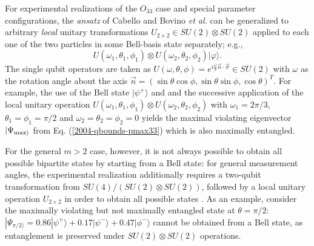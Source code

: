 \documentclass[prl,showpacs,showkeys,amsfonts,amsmath,twocolumn]{revtex4}
\begin{document}
For experimental realizations of the $O_{33}$ case and special parameter configurations,
the {\it ansatz} of Cabello \cite{cabello-2003a} and Bovino {\it et al.} \cite{bovino-2003}
can be generalized to arbitrary {\em local}
unitary transformations $U_{2\times 2} \in SU(2) \otimes SU(2)$ applied to each one of the two particles
in some Bell-basis state
separately; e.g.,
\begin{equation}
  U(\omega_1,\theta_1,\phi_1)\otimes U(\omega_2,\theta_2,\phi_2) |\varphi \rangle .
\label{2004-qbounds-gencab}
\end{equation}
The single
qubit operators are taken as $U(\omega,\theta,\phi) =
e^{i\frac{\omega}{2} \vec{n}\cdot\vec{\sigma}} \in SU(2)$ with
$\omega$ as the rotation angle about the axis $\vec{n}=
(\sin\theta\cos\phi,\sin\theta\sin\phi,\cos\theta)^T$.
For example, the use of the Bell state
$|\psi^+ \rangle $ and
and the successive application of the local unitary operation $U(\omega_1,\theta_1,\phi_1)\otimes
U(\omega_2,\theta_2,\phi_2)$ with $\omega_1 =2\pi/3$,
$\theta_1=\phi_1=\pi/2$ and $\omega_2=\theta_2=\phi_2=0$ yields the  maximal violating eigenvector
$|\Psi_{\rm max \rangle}$ from
Eq. (\ref{2004-qbounds-pmax33}) which is also maximally entangled.

For the general $m>2$ case,  however,
it is not always possible to obtain all possible bipartite states by starting from a Bell state:
for general measurement angles, the experimental realization additionally requires a two-qubit
transformation from
$SU(4)/(SU(2)\otimes SU(2))$, followed by a local
unitary operation $U_{2\times 2}$ in order to obtain all possible
states \cite{zhang-2003}.
As an example, consider the maximally violating but not maximally entangled state at $\theta=\pi/2$:
$|\Psi_{\pi/2 \rangle} = 0.86
  |\psi^+ \rangle + 0.17|\psi^- \rangle + 0.47|\phi^- \rangle$ cannot be
  obtained from a Bell state, as
  entanglement is preserved under $SU(2) \otimes SU(2)$ operations.
\end{document}
